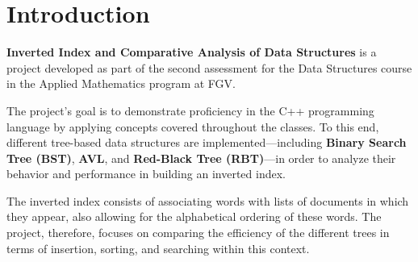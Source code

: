 \section{Introduction}


\textbf{Inverted Index and Comparative Analysis of Data Structures} is a project developed as part of the second assessment for the Data Structures course in the Applied Mathematics program at FGV.

The project's goal is to demonstrate proficiency in the C++ programming language by applying concepts covered throughout the classes. To this end, different tree-based data structures are implemented—including \textbf{Binary Search Tree (BST)}, \textbf{AVL}, and \textbf{Red-Black Tree (RBT)}—in order to analyze their behavior and performance in building an inverted index.

The inverted index consists of associating words with lists of documents in which they appear, also allowing for the alphabetical ordering of these words. The project, therefore, focuses on comparing the efficiency of the different trees in terms of insertion, sorting, and searching within this context.

